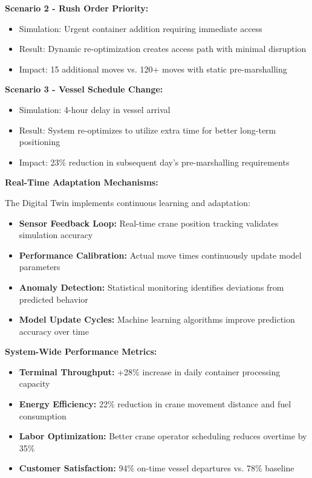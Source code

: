 \documentclass{article}
\begin{document}
\textbf{Scenario 2 - Rush Order Priority:}
\begin{itemize}
\item Simulation: Urgent container addition requiring immediate access
\item Result: Dynamic re-optimization creates access path with minimal disruption
\item Impact: 15 additional moves vs. 120+ moves with static pre-marshalling
\end{itemize}

\textbf{Scenario 3 - Vessel Schedule Change:}
\begin{itemize}
\item Simulation: 4-hour delay in vessel arrival
\item Result: System re-optimizes to utilize extra time for better long-term positioning
\item Impact: 23\% reduction in subsequent day's pre-marshalling requirements
\end{itemize}

\textbf{Real-Time Adaptation Mechanisms:}

The Digital Twin implements continuous learning and adaptation:
\begin{itemize}
\item \textbf{Sensor Feedback Loop:} Real-time crane position tracking validates simulation accuracy
\item \textbf{Performance Calibration:} Actual move times continuously update model parameters
\item \textbf{Anomaly Detection:} Statistical monitoring identifies deviations from predicted behavior
\item \textbf{Model Update Cycles:} Machine learning algorithms improve prediction accuracy over time
\end{itemize}

\textbf{System-Wide Performance Metrics:}
\begin{itemize}
\item \textbf{Terminal Throughput:} +28\% increase in daily container processing capacity
\item \textbf{Energy Efficiency:} 22\% reduction in crane movement distance and fuel consumption
\item \textbf{Labor Optimization:} Better crane operator scheduling reduces overtime by 35\%
\item \textbf{Customer Satisfaction:} 94\% on-time vessel departures vs. 78\% baseline
\end{itemize}
\end{document}
